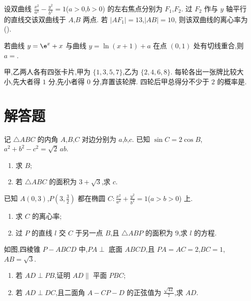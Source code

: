 \begin{problem}
设双曲线
\(\frac{x^2}{a^2}-\frac{y^2}{b^2}=1\)(\(a>0\),\(b>0\))
的左右焦点分别为 \(F_1\),\(F_2\). 过 \(F_2\) 作与 \(y\) 轴平行的直线交该双曲线于 \(A\),\(B\) 两点. 若
\(|AF_1|=13\),\(|AB|=10\),
则该双曲线的离心率为(\quad).

\end{problem}

\begin{problem}
若曲线 \(y=\e^x+x\) 与曲线 \(y=\ln(x+1)+a\) 在点 \((0,1)\) 处有切线重合,则 \(a=\)\fillinblank{}.
\end{problem}

\begin{problem}
甲,乙两人各有四张卡片,甲为 \(\{1,3,5,7\}\),乙为 \(\{2,4,6,8\}\). 每轮各出一张牌比较大小,先大者得 \(1\) 分,先小者得 \(0\) 分,弃置该轮牌. 四轮后甲总得分不少于 \(2\) 的概率是\fillinblank{}.
\end{problem}

\section{解答题}

\begin{problem}
记 \(\triangle ABC\) 的内角 \(A\),\(B\),\(C\) 对边分别为 \(a\),\(b\),\(c\). 已知
\(\sin C =2\cos B\),\(a^2+b^2-c^2=\sqrt2\,ab\).
\begin{enumerate}
\item 求 \(B\);
\item 若 \(\triangle ABC\) 的面积为 \(3+\sqrt3\),求 \(c\).
\end{enumerate}
\end{problem}

\begin{problem}
已知 \(A(0,3)\),\(P\left(3,\frac32\right)\) 都在椭圆
\(C:\frac{x^2}{a^2}+\frac{y^2}{b^2}=1\)(\(a>b>0\))
上.
\begin{enumerate}
\item 求 \(C\) 的离心率;
\item 过 \(P\) 的直线 \(l\) 交 \(C\) 于另一点 \(B\),且 \(\triangle ABP\) 的面积为 \(9\),求 \(l\) 的方程.
\end{enumerate}
\end{problem}

\begin{problem}
如图,四棱锥 \(P-ABCD\) 中,\(PA\perp\) 底面 \(ABCD\),且 \(PA=AC=2\),\(BC=1\),\(AB=\sqrt3\).

\begin{enumerate}
\item 若 \(AD\perp PB\),证明 \(AD\parallel\) 平面 \(PBC\);
\item 若 \(AD\perp DC\),且二面角 \(A-CP-D\) 的正弦值为 \(\frac{\sqrt{42}}{7}\),求 \(AD\).
\end{enumerate}

\end{problem}

